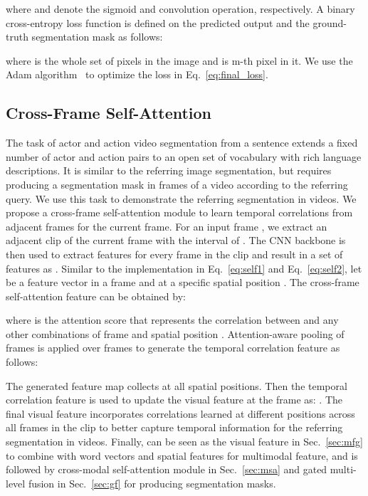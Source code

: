where  and  denote the sigmoid and  convolution operation, respectively. A binary cross-entropy loss function is defined on the predicted output and the ground-truth segmentation mask  as follows:

where  is the whole set of pixels in the image and  is m-th pixel in it. We use the Adam algorithm~\cite{kingma2014adam} to optimize the loss in Eq.~\ref{eq:final_loss}.



\subsection{Cross-Frame Self-Attention}\label{sec:cfsa}


The task of actor and action video segmentation from a sentence extends a fixed number of actor and action pairs to an open set of vocabulary with rich language descriptions. It is similar to the referring image segmentation, but requires producing a segmentation mask in frames of a video according to the referring query. We use this task to demonstrate the referring segmentation in videos. We propose a cross-frame self-attention module to learn temporal correlations from adjacent  frames for  the current frame. For an input frame , we extract an adjacent clip of the current frame with the interval of .  The CNN backbone is then used to extract features for every frame in the clip and result in a set of features as . Similar to the implementation in Eq.~\ref{eq:self1} and Eq.~\ref{eq:self2}, let  be a feature vector in a frame  and at a specific spatial position . The cross-frame self-attention feature  can be obtained by:

where  is the attention score that represents the correlation between  and any other combinations of frame and spatial position .
Attention-aware pooling of frames is applied over frames to generate the temporal correlation feature  as follows:


The generated feature map  collects  at all spatial positions. Then the temporal correlation feature  is used to update the visual feature  at the frame  as: . The final visual feature   incorporates correlations learned at different positions across all frames in the clip to better capture temporal information for the referring segmentation in videos. Finally,  can be seen as the visual feature  in Sec.~\ref{sec:mfg} to combine with word vectors and spatial features for multimodal feature, and is followed by cross-modal self-attention module in Sec.~\ref{sec:msa} and gated multi-level fusion in Sec.~\ref{sec:gf} for producing segmentation masks.












